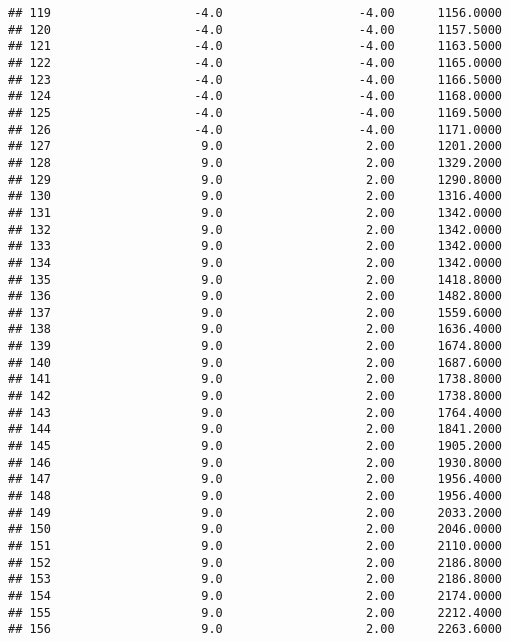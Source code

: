 \documentclass[]{article}
\begin{document}
\begin{verbatim}
## 119                    -4.0                   -4.00      1156.0000
## 120                    -4.0                   -4.00      1157.5000
## 121                    -4.0                   -4.00      1163.5000
## 122                    -4.0                   -4.00      1165.0000
## 123                    -4.0                   -4.00      1166.5000
## 124                    -4.0                   -4.00      1168.0000
## 125                    -4.0                   -4.00      1169.5000
## 126                    -4.0                   -4.00      1171.0000
## 127                     9.0                    2.00      1201.2000
## 128                     9.0                    2.00      1329.2000
## 129                     9.0                    2.00      1290.8000
## 130                     9.0                    2.00      1316.4000
## 131                     9.0                    2.00      1342.0000
## 132                     9.0                    2.00      1342.0000
## 133                     9.0                    2.00      1342.0000
## 134                     9.0                    2.00      1342.0000
## 135                     9.0                    2.00      1418.8000
## 136                     9.0                    2.00      1482.8000
## 137                     9.0                    2.00      1559.6000
## 138                     9.0                    2.00      1636.4000
## 139                     9.0                    2.00      1674.8000
## 140                     9.0                    2.00      1687.6000
## 141                     9.0                    2.00      1738.8000
## 142                     9.0                    2.00      1738.8000
## 143                     9.0                    2.00      1764.4000
## 144                     9.0                    2.00      1841.2000
## 145                     9.0                    2.00      1905.2000
## 146                     9.0                    2.00      1930.8000
## 147                     9.0                    2.00      1956.4000
## 148                     9.0                    2.00      1956.4000
## 149                     9.0                    2.00      2033.2000
## 150                     9.0                    2.00      2046.0000
## 151                     9.0                    2.00      2110.0000
## 152                     9.0                    2.00      2186.8000
## 153                     9.0                    2.00      2186.8000
## 154                     9.0                    2.00      2174.0000
## 155                     9.0                    2.00      2212.4000
## 156                     9.0                    2.00      2263.6000

\end{verbatim}
\end{document}
